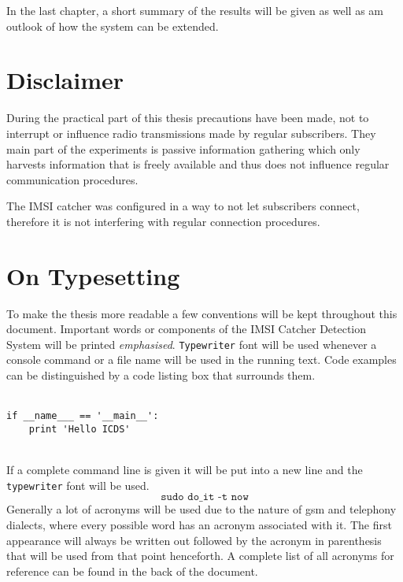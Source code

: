 In the last chapter, a short summary of the results will be given as well as am outlook of how the system can be extended.

\section{Disclaimer}
During the practical part of this thesis precautions have been made, not to interrupt or influence radio transmissions made by regular subscribers.
They main part of the experiments is passive information gathering which only harvests information that is freely available and thus does not influence regular communication procedures.

The IMSI catcher was configured in a way to not let subscribers connect, therefore it is not interfering with regular connection procedures.

\section{On Typesetting}
To make the thesis more readable a few conventions will be kept throughout this document.
Important words or components of the IMSI Catcher Detection System will be printed \emph{emphasised}.
\texttt{Typewriter} font will be used whenever a console command or a file name will be used in the running text.
Code examples can be distinguished by a code listing box that surrounds them.\\\\
\hspace*{\dimexpr\fboxsep+\fboxrule}%
\begin{minipage}{\dimexpr\textwidth-4\fboxsep-2\fboxrule} 
\begin{lstlisting} 
if __name___ == '__main__':
    print 'Hello ICDS'
\end{lstlisting} 
\end{minipage}\\
If a complete command line is given it will be put into a new line and the \texttt{typewriter} font will be used.
\[\texttt{sudo do\_it -t now}\]
Generally a lot of acronyms will be used due to the nature of \gls{gsm} and telephony dialects, where every possible word has an acronym associated with it.
The first appearance will always be written out followed by the acronym in parenthesis that will be used from that point henceforth.
A complete list of all acronyms for reference can be found in the back of the document.